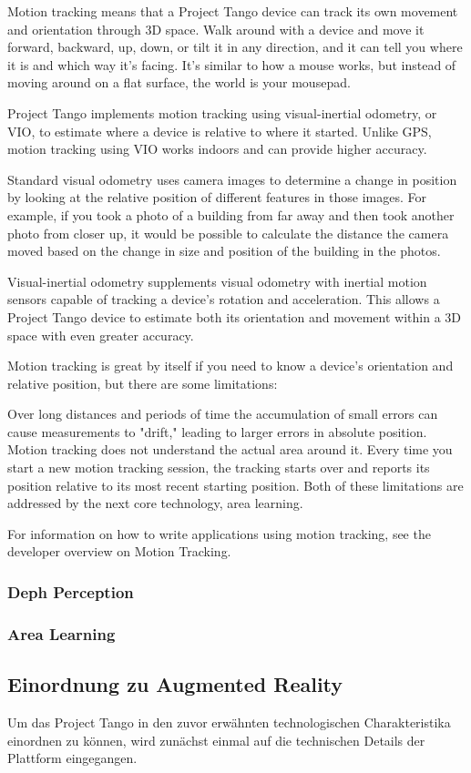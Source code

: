 Motion tracking means that a Project Tango device can track its own movement and orientation through 3D space. Walk around with a device and move it forward, backward, up, down, or tilt it in any direction, and it can tell you where it is and which way it's facing. It's similar to how a mouse works, but instead of moving around on a flat surface, the world is your mousepad.

Project Tango implements motion tracking using visual-inertial odometry, or VIO, to estimate where a device is relative to where it started. Unlike GPS, motion tracking using VIO works indoors and can provide higher accuracy.

Standard visual odometry uses camera images to determine a change in position by looking at the relative position of different features in those images. For example, if you took a photo of a building from far away and then took another photo from closer up, it would be possible to calculate the distance the camera moved based on the change in size and position of the building in the photos.

Visual-inertial odometry supplements visual odometry with inertial motion sensors capable of tracking a device's rotation and acceleration. This allows a Project Tango device to estimate both its orientation and movement within a 3D space with even greater accuracy.

Motion tracking is great by itself if you need to know a device's orientation and relative position, but there are some limitations:

Over long distances and periods of time the accumulation of small errors can cause measurements to "drift," leading to larger errors in absolute position.
Motion tracking does not understand the actual area around it. Every time you start a new motion tracking session, the tracking starts over and reports its position relative to its most recent starting position.
Both of these limitations are addressed by the next core technology, area learning.

For information on how to write applications using motion tracking, see the developer overview on Motion Tracking.

\subsubsection{Deph Perception}

\subsubsection{Area Learning}


\subsection{Einordnung zu Augmented Reality}

Um das Project Tango in den zuvor erwähnten technologischen Charakteristika einordnen zu können, wird zunächst einmal auf die technischen Details der Plattform eingegangen. 
